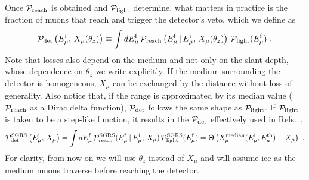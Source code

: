 \documentclass[aps,prd,showpacs,letterpaper,onecolumn,longbibliography,superscriptaddress,notitlepage,nofootinbib]{revtex4-1}%
\newcommand{\Emf}{E_{\mu}^{\rm f}}
\newcommand{\Emi}{E_{\mu}^{\rm i}}
\newcommand{\Prob}{{\cal P}}
\begin{document}
Once $\Prob_{\rm reach}$ is obtained and $\Prob_{\rm light}$ determine, what matters in practice is the fraction of muons that reach and trigger the detector's veto, which we define as
%
\begin{equation}
\label{eq:PrPl}
\Prob_{\rm det}\left(\Emi , \, X_\mu(\theta_z)\right) \equiv \int d\Emf \, \Prob_{\rm reach}\left(\Emf \, | \, \Emi , \, X_\mu(\theta_z)\right) \, \Prob_{\rm light} (\Emf) ~.
\end{equation}
%
Note that losses also depend on the medium and not only on the slant depth, whose dependence on $\theta_z$ we write explicitly. If the medium surrounding the detector is homogeneous, $X_\mu$ can be exchanged by the distance without loss of generality. Also notice that, if the range is approximated by its median value ($\Prob_{\rm reach}$ as a Dirac delta function), $\Prob_{\rm det}$ follows the same shape as $\Prob_{\rm light}$. If $\Prob_{\rm light}$ is taken to be a step-like function, it results in the $\Prob_{\rm det}$ effectively used in Refs.~\cite{Schonert:2008is, Gaisser:2014bja},
%
\begin{equation}
\label{eq:PrPlSGRS}
\Prob_{\rm det}^{\rm SGRS} \left(\Emi , \, X_\mu\right) = \int d\Emf \, \Prob_{\rm reach}^{\rm SGRS} (\Emf \, | \, \Emi , \, X_\mu) \, \Prob_{\rm light}^{\rm SGRS} (\Emf) = \Theta\left(X_{\mu}^{\rm median}(\Emi, E_{\mu}^{\rm th}) - X_{\mu}\right) ~.
\end{equation}
%
For clarity, from now on we will use $\theta_z$ instead of $X_\mu$ and will assume ice as the medium muons traverse before reaching the detector.
\end{document}
